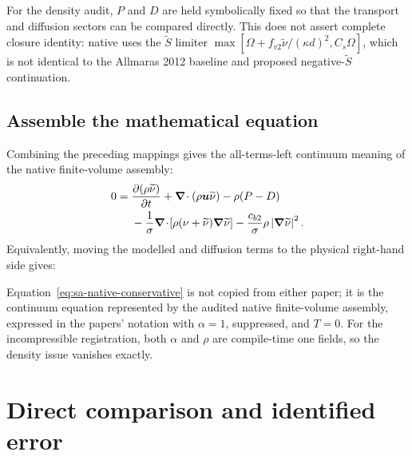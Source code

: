 For the density audit, \(P\) and \(D\) are held symbolically fixed so that the
transport and diffusion sectors can be compared directly.  This does not
assert complete closure identity: native \SAOF{} uses the
\(\widetilde S\) limiter
\(\max[\Omega+f_{v2}\widetilde{\nu}/(\kappa d)^2,C_s\Omega]\), which is not
identical to the Allmaras 2012 baseline and proposed negative-\(\widetilde S\)
continuation.

\subsection{Assemble the mathematical equation}

Combining the preceding mappings gives the all-terms-left continuum meaning of
the native finite-volume assembly:
\begin{align}
  0={}&
  \frac{\partial(\rho\widetilde{\nu})}{\partial t}
  +\boldsymbol{\nabla}\!\cdot(\rho\boldsymbol u\widetilde{\nu})
  -\rho(P-D) \notag\\
  &-\frac{1}{\sigma}
    \boldsymbol{\nabla}\!\cdot\!\left[
      \rho(\nu+\widetilde{\nu})\boldsymbol{\nabla}\widetilde{\nu}
    \right]
  -\frac{c_{b2}}{\sigma}\rho
    \left|\boldsymbol{\nabla}\widetilde{\nu}\right|^2.
  \label{eq:sa-native-residual}
\end{align}
Equivalently, moving the modelled and diffusion terms to the physical
right-hand side gives:

\par
Equation~\eqref{eq:sa-native-conservative} is not copied from either paper; it
is the continuum equation represented by the audited native finite-volume
assembly, expressed in the papers' notation with \(\alpha=1\),
 suppressed, and \(T=0\).  For the incompressible
registration, both \(\alpha\) and \(\rho\) are compile-time one fields, so the
density issue vanishes exactly.

\Needspace{0.47\textheight}
\section{Direct comparison and identified error}
\label{sec:sa-comparison}

